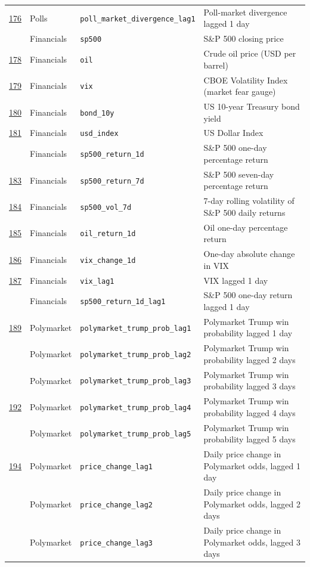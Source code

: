\begin{longtable}{>{\centering\arraybackslash}p{0.9cm} p{2cm} p{4cm} p{7.5cm}}
\underline{176} & Polls & \texttt{poll\_market\_divergence\_lag1} & Poll-market divergence lagged 1 day \\
177 & Financials & \texttt{sp500} & S\&P 500 closing price \\
\underline{178} & Financials & \texttt{oil} & Crude oil price (USD per barrel) \\
\underline{179} & Financials & \texttt{vix} & CBOE Volatility Index (market fear gauge) \\
\underline{180} & Financials & \texttt{bond\_10y} & US 10-year Treasury bond yield \\
\underline{181} & Financials & \texttt{usd\_index} & US Dollar Index \\
182 & Financials & \texttt{sp500\_return\_1d} & S\&P 500 one-day percentage return \\
\underline{183} & Financials & \texttt{sp500\_return\_7d} & S\&P 500 seven-day percentage return \\
\underline{184} & Financials & \texttt{sp500\_vol\_7d} & 7-day rolling volatility of S\&P 500 daily returns \\
\underline{185} & Financials & \texttt{oil\_return\_1d} & Oil one-day percentage return \\
\underline{186} & Financials & \texttt{vix\_change\_1d} & One-day absolute change in VIX \\
\underline{187} & Financials & \texttt{vix\_lag1} & VIX lagged 1 day \\
188 & Financials & \texttt{sp500\_return\_1d\_lag1} & S\&P 500 one-day return lagged 1 day \\
\underline{189} & Polymarket & \texttt{polymarket\_trump\_prob\_lag1} & Polymarket Trump win probability lagged 1 day \\
190 & Polymarket & \texttt{polymarket\_trump\_prob\_lag2} & Polymarket Trump win probability lagged 2 days \\
191 & Polymarket & \texttt{polymarket\_trump\_prob\_lag3} & Polymarket Trump win probability lagged 3 days \\
\underline{192} & Polymarket & \texttt{polymarket\_trump\_prob\_lag4} & Polymarket Trump win probability lagged 4 days \\
193 & Polymarket & \texttt{polymarket\_trump\_prob\_lag5} & Polymarket Trump win probability lagged 5 days \\
\underline{194} & Polymarket & \texttt{price\_change\_lag1} & Daily price change in Polymarket odds, lagged 1 day \\
195 & Polymarket & \texttt{price\_change\_lag2} & Daily price change in Polymarket odds, lagged 2 days \\
196 & Polymarket & \texttt{price\_change\_lag3} & Daily price change in Polymarket odds, lagged 3 days \\
\end{longtable}
\flushbottom

